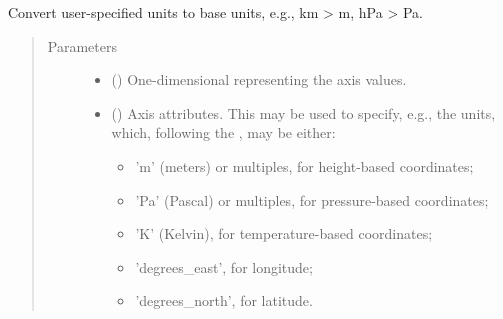 \documentclass[letterpaper,10pt,english]{sphinxmanual}
\begin{document}
\begin{fulllineitems}
\begin{fulllineitems}
\begin{quote}
\begin{description}
\begin{itemize}
\begin{itemize}
\end{itemize}


\end{itemize}

\end{description}\end{quote}

\end{fulllineitems}


\begin{fulllineitems}
\label{\detokenize{api:grids.axis.Axis._check_arguments}}
Convert user-specified units to base units, e.g., km \textendash{}\textgreater{} m, hPa \textendash{}\textgreater{} Pa.
\begin{quote}\begin{description}
\item[{Parameters}] \leavevmode\begin{itemize}
\item {} 
 () \textendash{} One-dimensional  representing the axis values.

\item {} 
 () \textendash{} 
Axis attributes. This may be used to specify, e.g., the units, which, following the
, may be either:
\begin{itemize}
\item {} 
’m’ (meters) or multiples, for height-based coordinates;

\item {} 
’Pa’ (Pascal) or multiples, for pressure-based coordinates;

\item {} 
’K’ (Kelvin), for temperature-based coordinates;

\item {} 
’degrees\_east’, for longitude;

\item {} 
’degrees\_north’, for latitude.

\end{itemize}



\end{itemize}
\end{description}
\end{quote}
\end{fulllineitems}
\end{fulllineitems}
\end{document}
